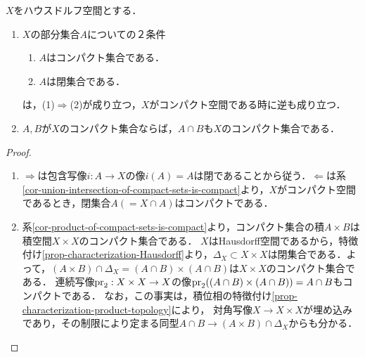 \documentclass[uplatex,dvipdfmx]{jsreport}
\begin{document}
\begin{proposition}[Hausdorff空間内でのコンパクト集合]\label{prop-compact-set-in-Hausdorff-spaces}
    $X$をハウスドルフ空間とする．
    \begin{enumerate}
        \item $X$の部分集合$A$についての２条件
        \begin{enumerate}[(1)]
            \item $A$はコンパクト集合である．
            \item $A$は閉集合である．
        \end{enumerate}
        は，(1)$\Rightarrow$(2)が成り立つ，$X$がコンパクト空間である時に逆も成り立つ．
        \item $A,B$が$X$のコンパクト集合ならば，$A\cap B$も$X$のコンパクト集合である．
    \end{enumerate}
\end{proposition}
\begin{proof}\mbox{}
    \begin{enumerate}
        \item $\Rightarrow$は包含写像$i:A\to X$の像$i(A)=A$は閉であることから従う．$\Leftarrow$は系\ref{cor-union-intersection-of-compact-sets-is-compact}より，$X$がコンパクト空間であるとき，閉集合$A(=X\cap A)$はコンパクトである．
        \item 系\ref{cor-product-of-compact-sets-is-compact}より，コンパクト集合の積$A\times B$は積空間$X\times X$のコンパクト集合である．
        $X$はHausdorff空間であるから，特徴付け\ref{prop-characterization-Hausdorff}より，$\Delta_X\subset X\times X$は閉集合である．よって，$(A\times B)\cap\Delta_X=(A\cap B)\times(A\cap B)$は$X\times X$のコンパクト集合である．
        連続写像$\mathrm{pr}_2:X\times X\to X$の像$\mathrm{pr}_2((A\cap B)\times (A\cap B))=A\cap B$もコンパクトである．
        なお，この事実は，積位相の特徴付け\ref{prop-characterization-product-topology}により，
        対角写像$X\to X\times X$が埋め込みであり，その制限により定まる同型$A\cap B\to(A\times B)\cap\Delta_X$からも分かる．
    \end{enumerate}
\end{proof}
\end{document}
